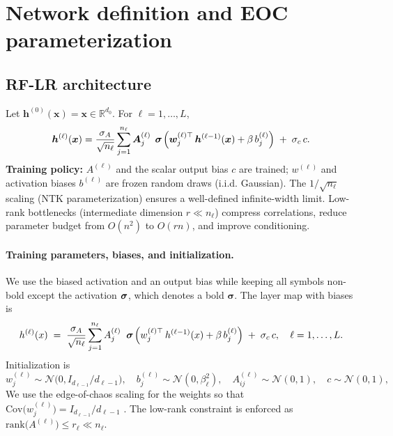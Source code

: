 \section{Network definition and EOC parameterization}

\vspace{1em}
\subsection{RF-LR architecture}
Let \( \bm{h}^{(0)}(\bm{x})=\bm{x}\in\mathbb{R}^{d_0} \). For \( \ell=1,\dots,L \),
\begin{equation}
\label{eq:RF-LR}
\bm{h}^{(\ell)}(\bm{x})
= \frac{\sigma_A}{\sqrt{n_\ell}} \sum_{j=1}^{n_\ell} \bm{A}^{(\ell)}_j\,
\mathrel{\boldsymbol{\sigma}}\!\Big(\bm{w}^{(\ell)\top}_j\,\bm{h}^{(\ell-1)}(\bm{x}) + \beta\, b^{(\ell)}_j\Big) \;+\; \sigma_c\, c.
\end{equation}
\textbf{Training policy:} \( A^{(\ell)} \) and the scalar output bias \( c \) are trained; \( w^{(\ell)} \) and activation biases \( b^{(\ell)} \) are frozen random draws (i.i.d. Gaussian). The \( 1/\sqrt{n_\ell} \) scaling (NTK parameterization) ensures a well-defined infinite-width limit. Low-rank bottlenecks (intermediate dimension \( r\ll n_\ell \)) compress correlations, reduce parameter budget from \( O(n^2) \) to \( O(rn) \), and improve conditioning.

\paragraph{Training parameters, biases, and initialization.}
We use the biased activation and an output bias while keeping all symbols non-bold except the activation \( \mathrel{\boldsymbol{\sigma}} \), which denotes a bold \( \boldsymbol{\sigma} \). The layer map with biases is
\[
h^{(\ell)}(x) \;=\; \frac{\sigma_A}{\sqrt{n_\ell}} \sum_{j=1}^{n_\ell} A^{(\ell)}_j\;\mathrel{\boldsymbol{\sigma}}\!\Big(w^{(\ell)\top}_j\,h^{(\ell-1)}(x) + \beta\, b^{(\ell)}_j\Big) \;+\; \sigma_c\, c, \quad \ell=1,\dots,L.
\]
Initialization is
\[
w^{(\ell)}_j \sim \mathcal{N}\!\big(0, I_{d_{\ell-1}}/d_{\ell-1}\big),\quad
b^{(\ell)}_j \sim \mathcal{N}(0, \beta_\ell^2),\quad
A^{(\ell)}_{ij} \sim \mathcal{N}\!(0, 1),\quad
c \sim \mathcal{N}(0, 1),
\]
We use the edge-of-chaos scaling for the weights so that \( \mathrm{Cov}\!\big(w^{(\ell)}_j\big) = I_{d_{\ell-1}}/d_{\ell-1} \) \cite{hayou2018selectioninitializationactivationfunction}.
The low-rank constraint is enforced as \( \mathrm{rank}\!\big(A^{(\ell)}\big)\le r_\ell \ll n_\ell \).

